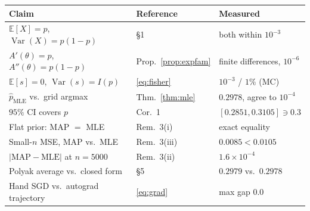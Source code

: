 \documentclass[11pt]{article}
\theoremstyle{remark}
\newcommand{\E}{\mathbb{E}}
\newcommand{\Var}{\operatorname{Var}}
\newcommand{\phat}{\hat{p}}
\begin{document}
\begin{center}
\begin{tabular}{lll}
\toprule
Claim & Reference & Measured\\
\midrule
$\E[X] = p$, $\Var(X) = p(1-p)$ & \S1 & both within $10^{-3}$\\
$A'(\theta) = p$, $A''(\theta) = p(1-p)$ & Prop.~\ref{prop:expfam}
  & finite differences, $10^{-6}$\\
$\E[s] = 0$, $\Var(s) = I(p)$ & \eqref{eq:fisher}
  & $10^{-3}$ / $1\%$ (MC)\\
$\phat_{\mathrm{MLE}}$ vs.\ grid argmax & Thm.~\ref{thm:mle}
  & $0.2978$, agree to $10^{-4}$\\
$95\%$ CI covers $p$ & Cor.~1 & $[0.2851, 0.3105] \ni 0.3$\\
Flat prior: MAP $=$ MLE & Rem.~3(i) & exact equality\\
Small-$n$ MSE, MAP vs.\ MLE & Rem.~3(iii) & $0.0085 < 0.0105$\\
$|\mathrm{MAP} - \mathrm{MLE}|$ at $n = 5000$ & Rem.~3(ii)
  & $1.6 \times 10^{-4}$\\
Polyak average vs.\ closed form & \S5 & $0.2979$ vs.\ $0.2978$\\
Hand SGD vs.\ autograd trajectory & \eqref{eq:grad}
  & max gap $0.0$\\
\bottomrule
\end{tabular}
\end{center}
\end{document}

